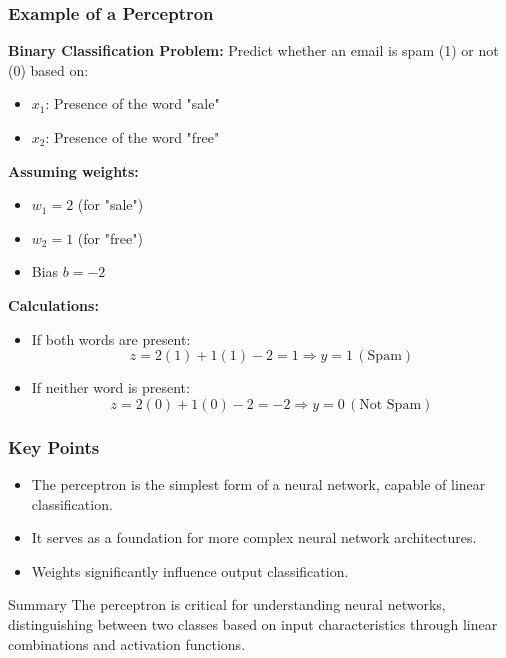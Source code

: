 \documentclass[aspectratio=169]{beamer}
\begin{document}
\begin{frame}[fragile]
    \frametitle{Example of a Perceptron}
    \textbf{Binary Classification Problem:} Predict whether an email is spam (1) or not (0) based on:

    \begin{itemize}
        \item $x_1$: Presence of the word "sale"
        \item $x_2$: Presence of the word "free"
    \end{itemize}

    \textbf{Assuming weights:}
    \begin{itemize}
        \item $w_1 = 2$ (for "sale")
        \item $w_2 = 1$ (for "free")
        \item Bias $b = -2$
    \end{itemize}

    \textbf{Calculations:}
    \begin{itemize}
        \item If both words are present: 
        \[
        z = 2(1) + 1(1) - 2 = 1 \Rightarrow y = 1 \,(\text{Spam})
        \]
        
        \item If neither word is present: 
        \[
        z = 2(0) + 1(0) - 2 = -2 \Rightarrow y = 0 \,(\text{Not Spam})
        \]
    \end{itemize}
\end{frame}

\begin{frame}[fragile]
    \frametitle{Key Points}
    \begin{itemize}
        \item The perceptron is the simplest form of a neural network, capable of linear classification.
        \item It serves as a foundation for more complex neural network architectures.
        \item Weights significantly influence output classification.
    \end{itemize}
    \begin{block}{Summary}
        The perceptron is critical for understanding neural networks, distinguishing between two classes based on input characteristics through linear combinations and activation functions.
    \end{block}
\end{frame}
\end{document}
